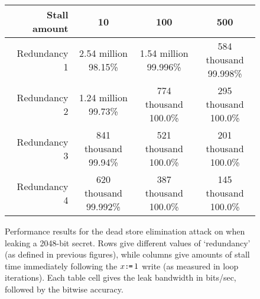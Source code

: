 \begin{figure}
  \small
  \begin{tabular}{ r | c | c | c }%
    Stall amount & 10 &
                   100 &
                   500 \\ \hline
    Redundancy 1 & \makecell{2.54 million\\98.15\%} &
                   \makecell{1.54 million\\99.996\%} &
                   \makecell{584 thousand\\99.998\%} \\ \hline
    Redundancy 2 & \makecell{1.24 million\\99.73\%} &
                   \makecell{774 thousand\\100.0\%} &
                   \makecell{295 thousand\\100.0\%} \\ \hline
    Redundancy 3 & \makecell{841 thousand\\99.94\%} &
                   \makecell{521 thousand\\100.0\%} &
                   \makecell{201 thousand\\100.0\%} \\ \hline
    Redundancy 4 & \makecell{620 thousand\\99.992\%} &
                   \makecell{387 thousand\\100.0\%} &
                   \makecell{145 thousand\\100.0\%} \\
  \end{tabular}
  \caption{
    Performance results for the dead store elimination attack on {\GCC} when
    leaking a 2048-bit secret.
    Rows give different values of `redundancy' (as defined in previous figures),
    while columns give amounts of stall time immediately following the
    $x\texttt{:}\mkern-1mu\texttt{=}\, 1$ write (as measured in loop iterations).
    Each table cell gives the leak bandwidth in bits/sec, followed by the
    bitwise accuracy.
  }
  \label{fig:gcc-dse-perf}
\end{figure}

